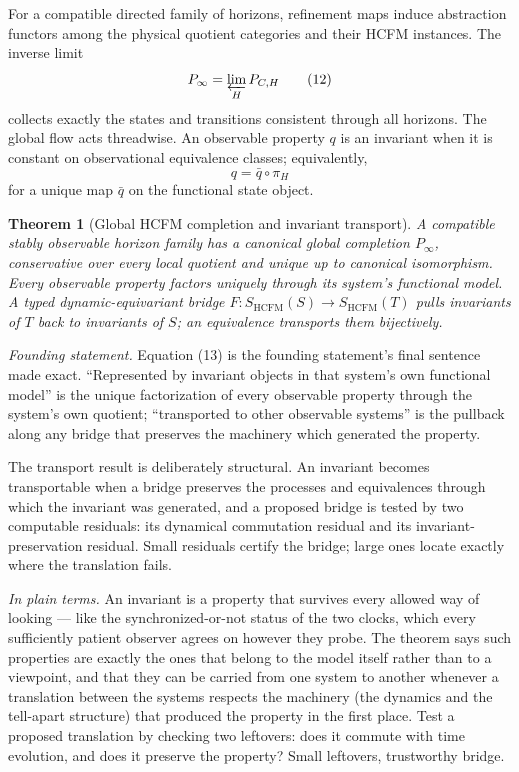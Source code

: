 \documentclass[11pt]{article}
\newtheorem{theorem}{Theorem}
\theoremstyle{definition}
\newcommand{\plainterms}{\emph{In plain terms.}}
\newcommand{\founding}{\emph{Founding statement.}}
\begin{document}
For a compatible directed family of horizons, refinement maps induce abstraction functors among the physical quotient categories and their HCFM instances. The inverse limit
\begin{equation}
P_\infty = \varprojlim_{H} P_{C,H} \tag{12}
\end{equation}
collects exactly the states and transitions consistent through all horizons. The global flow acts threadwise. An observable property $q$ is an invariant when it is constant on observational equivalence classes; equivalently,
\begin{equation}
q = \bar{q} \circ \pi_H \tag{13}
\end{equation}
for a unique map $\bar{q}$ on the functional state object.

\begin{theorem}[Global HCFM completion and invariant transport]
\label{thm:global-hcfm-completion}
A compatible stably observable horizon family has a canonical global completion $P_\infty$, conservative over every local quotient and unique up to canonical isomorphism. Every observable property factors uniquely through its system's functional model. A typed dynamic-equivariant bridge $F : S_{\mathrm{HCFM}}(S) \to S_{\mathrm{HCFM}}(T)$ pulls invariants of $T$ back to invariants of $S$; an equivalence transports them bijectively.
\end{theorem}

\noindent\founding{} Equation (13) is the founding statement's final sentence made exact. ``Represented by invariant objects in that system's own functional model'' is the unique factorization of every observable property through the system's own quotient; ``transported to other observable systems'' is the pullback along any bridge that preserves the machinery which generated the property.

The transport result is deliberately structural. An invariant becomes transportable when a bridge preserves the processes and equivalences through which the invariant was generated, and a proposed bridge is tested by two computable residuals: its dynamical commutation residual and its invariant-preservation residual. Small residuals certify the bridge; large ones locate exactly where the translation fails.

\noindent\plainterms{} An invariant is a property that survives every allowed way of looking --- like the synchronized-or-not status of the two clocks, which every sufficiently patient observer agrees on however they probe. The theorem says such properties are exactly the ones that belong to the model itself rather than to a viewpoint, and that they can be carried from one system to another whenever a translation between the systems respects the machinery (the dynamics and the tell-apart structure) that produced the property in the first place. Test a proposed translation by checking two leftovers: does it commute with time evolution, and does it preserve the property? Small leftovers, trustworthy bridge.
\end{document}

